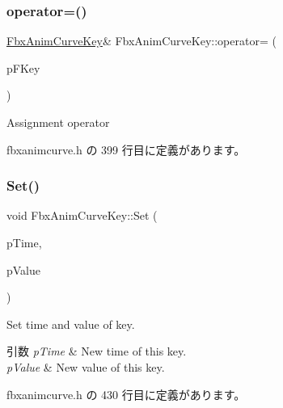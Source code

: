 \mbox{\label{class_fbx_anim_curve_key_a13c344143cd73f6809edbbb91df08c0e}} 
\subsubsection{\texorpdfstring{operator=()}{operator=()}}
{\footnotesize\ttfamily \hyperlink{class_fbx_anim_curve_key}{Fbx\+Anim\+Curve\+Key}\& Fbx\+Anim\+Curve\+Key\+::operator= (\begin{DoxyParamCaption}\item[{const \hyperlink{class_fbx_anim_curve_key}{Fbx\+Anim\+Curve\+Key} \&}]{p\+F\+Key }\end{DoxyParamCaption})\hspace{0.3cm}{\ttfamily [inline]}}

Assignment operator 

 fbxanimcurve.\+h の 399 行目に定義があります。

\mbox{\label{class_fbx_anim_curve_key_afdab5f0d38bedc7c4715aaa6a51d4370}} 
\subsubsection{\texorpdfstring{Set()}{Set()}}
{\footnotesize\ttfamily void Fbx\+Anim\+Curve\+Key\+::\+Set (\begin{DoxyParamCaption}\item[{\hyperlink{class_fbx_time}{Fbx\+Time}}]{p\+Time,  }\item[{float}]{p\+Value }\end{DoxyParamCaption})\hspace{0.3cm}{\ttfamily [inline]}}

Set time and value of key. 
\begin{DoxyParams}{引数}
{\em p\+Time} & New time of this key. \\
\hline
{\em p\+Value} & New value of this key. \\
\hline
\end{DoxyParams}


 fbxanimcurve.\+h の 430 行目に定義があります。

\mbox{\label{class_fbx_anim_curve_key_afa4c2dc0dd61a5f1bf28a1463b3ac859}} 
